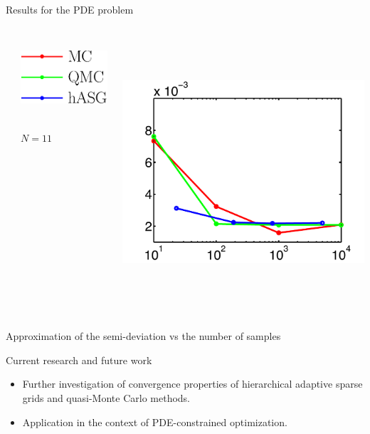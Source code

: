 \documentclass[final]{beamer}
\newcommand{\E}{\ensuremath{\mathbb{E}} } %
\newcommand{\bx}{\ensuremath{\mathbf{x}}} %
\begin{document}
\begin{frame}{}
{\begin{columns}[t]
\begin{column}{.30\linewidth}
\begin{block}{\centering Results for the PDE problem}
\begin{columns}[T]
\begin{column}{12cm}{}
\end{column}
\begin{column}{4cm}{}
\vspace{2cm}
\centering\includegraphics[height=3cm,width=5cm]{figures/legend2}\\
\vspace{1em}
\raggedright{\footnotesize{$N=11$}}
\end{column}
\begin{column}{14cm}{}
\includegraphics[height=10cm, width = 14cm]{figures/semidev11errors}\\
\end{column}
\end{columns}
\vspace{0.5em}
\centering\scriptsize{Approximation of the semi-deviation vs the number of samples}
\end{block}



                
                
\begin{block}{\centering Current research and future work}
\begin{itemize}
\item Further investigation of convergence properties of hierarchical adaptive sparse grids and quasi-Monte Carlo methods.
\item Application in the context of PDE-constrained optimization.
\end{itemize}
\end{block}
                

\end{column}
\end{columns}}
\end{frame}
\end{document}
